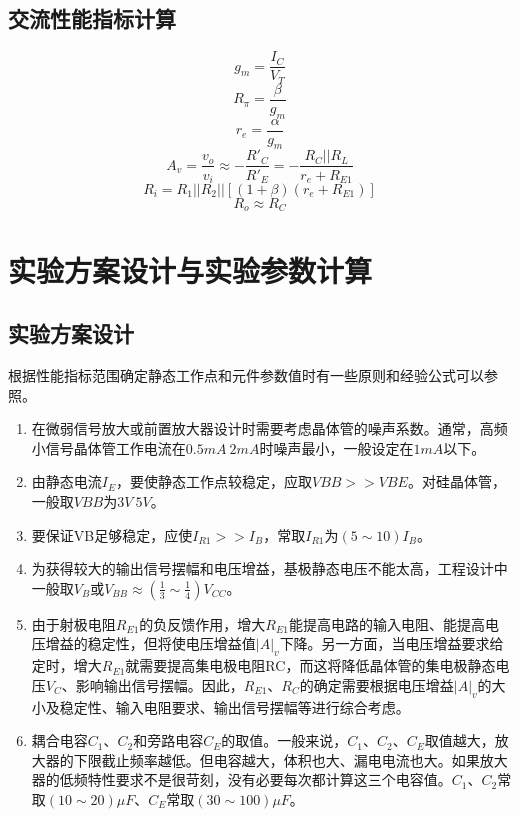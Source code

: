 \documentclass{../source/Experiment}
\begin{document}
        \subsection{交流性能指标计算}
        $$g_m=\frac{I_C}{V_T}$$    
        $$R_{\pi}=\frac{\beta}{g_m}$$    
        $$r_e=\frac{\alpha}{g_m}$$
        $$A_v=\frac{v_o}{v_i}\approx-\frac{R'_C}{R'_E}=-\frac{R_C||R_L}{r_e+R_{E1}}$$
        $$R_i=R_1||R_2||[(1+\beta)(r_e+R_{E1})]$$
        $$R_o\approx R_C$$
    \section{实验方案设计与实验参数计算}
        \subsection{实验方案设计}
        根据性能指标范围确定静态工作点和元件参数值时有一些原则和经验公式可以参照。
            \begin{enumerate}
                \item 在微弱信号放大或前置放大器设计时需要考虑晶体管的噪声系数。通常，高频小信号晶体管工作电流在$0.5mA~2mA$时噪声最小，一般设定在$1mA$以下。
                \item 由静态电流$I_E$，要使静态工作点较稳定，应取$VBB>>VBE$。对硅晶体管，一般取$VBB$为$3V~5V$。
                \item 要保证VB足够稳定，应使$I_{R1}>>I_B$，常取$I_{R1}$为$(5\sim 10)I_B$。
                \item 为获得较大的输出信号摆幅和电压增益，基极静态电压不能太高，工程设计中一般取$V_B$或$V_{BB} \approx (\frac{1}{3}\sim \frac{1}{4})V_{CC}$。
                \item 由于射极电阻$R_{E1}$的负反馈作用，增大$R_{E1}$能提高电路的输入电阻、能提高电压增益的稳定性，但将使电压增益值$|A|_v$下降。另一方面，当电压增益要求给定时，增大$R_{E1}$就需要提高集电极电阻RC，而这将降低晶体管的集电极静态电压$V_C$、影响输出信号摆幅。因此，$R_{E1}$、$R_C$的确定需要根据电压增益$|A|_v$的大小及稳定性、输入电阻要求、输出信号摆幅等进行综合考虑。
                \item 耦合电容$C_1$、$C_2$和旁路电容$C_E$的取值。一般来说，$C_1$、$C_2$、$C_E$取值越大，放大器的下限截止频率越低。但电容越大，体积也大、漏电电流也大。如果放大器的低频特性要求不是很苛刻，没有必要每次都计算这三个电容值。$C_1$、$C_2$常取$(10\sim 20)μF$、$C_E$常取$(30\sim 100)μF$。
            \end{enumerate}
\end{document}
